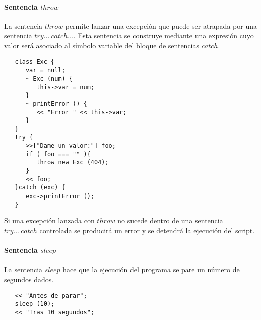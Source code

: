 

\paragraph{Sentencia $throw$} \label{sec:stmt_throw}

La sentencia $throw$ permite lanzar una excepción que puede ser atrapada por una 
sentencia $try...\ catch...$. Esta sentencia se construye mediante una expresión cuyo 
valor será asociado al símbolo variable del bloque de sentencias $catch$. \\

\begin{lstlisting}
   class Exc {
      var = null;
      ~ Exc (num) {
         this->var = num;
      }
      ~ printError () {
         << "Error " << this->var;
      }
   }
   try {
      >>["Dame un valor:"] foo;
      if ( foo === "" ){
         throw new Exc (404);
      } 
      << foo;
   }catch (exc) {
      exc->printError ();
   }
\end{lstlisting}

Si una excepción lanzada con $throw$ no sucede dentro de una sentencia $try...\ catch$ controlada
se producirá un error y se detendrá la ejecución del script.


\paragraph{Sentencia $sleep$} \label{sec:stmt_sleep}

La sentencia $sleep$ hace que la ejecución del programa se pare un número de segundos dados. \\

\begin{lstlisting}
   << "Antes de parar";
   sleep (10);
   << "Tras 10 segundos";
\end{lstlisting}



